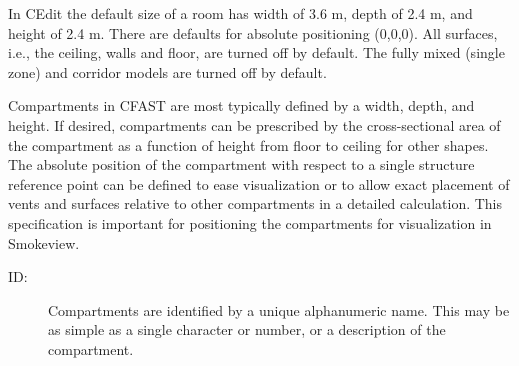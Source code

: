In CEdit the default size of a room has width of 3.6 m, depth of 2.4 m, and height of 2.4 m. There are defaults for absolute positioning (0,0,0). All surfaces, i.e., the ceiling, walls and floor, are turned off by default. The fully mixed (single zone) and corridor models are turned off by default.

\label{Compartment_Geometry}Compartments in CFAST are most typically defined by a width, depth, and height.  If desired, compartments can be prescribed by the cross-sectional area of the compartment as a function of height from floor to ceiling for other shapes. The absolute position of the compartment with respect to a single structure reference point can be defined to ease visualization or to allow exact placement of vents and surfaces relative to other compartments in a detailed calculation. This specification is important for positioning the compartments for visualization in Smokeview.

\begin{description}
\item[ ID:] Compartments are identified by a unique alphanumeric name.  This may be as simple as a single character or number, or a description of the compartment.
\end{description}




